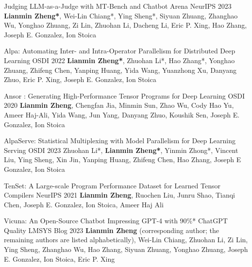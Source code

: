 
\begin{cventries}


\cventry
{}
{Judging LLM-as-a-Judge with MT-Bench and Chatbot Arena} %
{NeurIPS 2023} %
{} %
{\textbf{Lianmin Zheng*}, Wei-Lin Chiang*, Ying Sheng*, Siyuan Zhuang, Zhanghao Wu, Yonghao Zhuang, Zi Lin, Zhuohan Li, Dacheng Li, Eric P. Xing, Hao Zhang, Joseph E. Gonzalez, Ion Stoica}

\cventry
{}
{Alpa: Automating Inter- and Intra-Operator Parallelism for Distributed Deep Learning} %
{OSDI 2022} %
{} %
{\textbf{Lianmin Zheng*}, Zhuohan Li*, Hao Zhang*, Yonghao Zhuang, Zhifeng Chen, Yanping Huang, Yida Wang, Yuanzhong Xu, Danyang Zhuo, Eric P. Xing, Joseph E. Gonzalez, Ion Stoica}

\cventry
{}
{Ansor : Generating High-Performance Tensor Programs for Deep Learning} %
{OSDI 2020} %
{} %
{\textbf{Lianmin Zheng}, Chengfan Jia, Minmin Sun, Zhao Wu, Cody Hao Yu, Ameer Haj-Ali, Yida Wang, Jun Yang, Danyang Zhuo, Koushik Sen, Joseph E. Gonzalez, Ion Stoica}

\cventry
{}
{AlpaServe: Statistical Multiplexing with Model Parallelism for Deep Learning Serving} %
{OSDI 2023} %
{} %
{Zhuohan Li*, \textbf{Lianmin Zheng*}, Yinmin Zhong*, Vincent Liu, Ying Sheng, Xin Jin, Yanping Huang, Zhifeng Chen, Hao Zhang, Joseph E Gonzalez, Ion Stoica}

\cventry
{}
{TenSet: A Large-scale Program Performance Dataset for Learned Tensor Compilers} %
{NeurIPS 2021} %
{} %
{\textbf{Lianmin Zheng}, Ruochen Liu, Junru Shao, Tianqi Chen, Joseph E. Gonzalez, Ion Stoica, Ameer Haj Ali}

\cventry
{}
{Vicuna: An Open-Source Chatbot Impressing GPT-4 with 90\%* ChatGPT Quality} %
{LMSYS Blog 2023} %
{} %
{\textbf{Lianmin Zheng} (corresponding author; the remaining authors are listed alphabetically), Wei-Lin Chiang, Zhuohan Li, Zi Lin, Ying Sheng, Zhanghao Wu, Hao Zhang, Siyuan Zhuang, Yonghao Zhuang, Joseph E. Gonzalez, Ion Stoica, Eric P. Xing}


\end{cventries}
